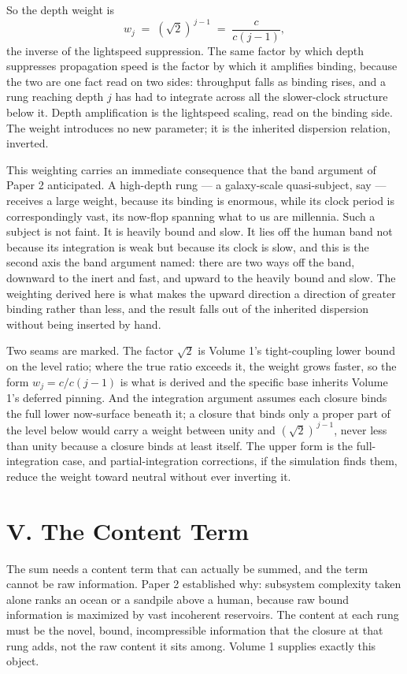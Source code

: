 \documentclass[11pt,oneside]{report}
\theoremstyle{definition}
\theoremstyle{remark}
\begin{document}
So the depth weight is
\[
w_{j} \;=\; (\sqrt{2})^{\,j-1} \;=\; \frac{c}{c(j-1)},
\]
the inverse of the lightspeed suppression. The same factor by which depth
suppresses propagation speed is the factor by which it amplifies binding,
because the two are one fact read on two sides: throughput falls as binding
rises, and a rung reaching depth \ensuremath{j} has had to integrate across all
the slower-clock structure below it. Depth amplification is the lightspeed
scaling, read on the binding side. The weight introduces no new parameter; it
is the inherited dispersion relation, inverted.

This weighting carries an immediate consequence that the band argument of
Paper 2 anticipated. A high-depth rung --- a galaxy-scale quasi-subject, say
--- receives a large weight, because its binding is enormous, while its clock
period is correspondingly vast, its now-flop spanning what to us are
millennia. Such a subject is not faint. It is heavily bound and slow. It lies
off the human band not because its integration is weak but because its clock
is slow, and this is the second axis the band argument named: there are two
ways off the band, downward to the inert and fast, and upward to the heavily
bound and slow. The weighting derived here is what makes the upward direction
a direction of greater binding rather than less, and the result falls out of
the inherited dispersion without being inserted by hand.

Two seams are marked. The factor \ensuremath{\sqrt{2}} is Volume 1's
tight-coupling lower bound on the level ratio; where the true ratio exceeds it,
the weight grows faster, so the form \ensuremath{w_{j} = c/c(j-1)} is what is
derived and the specific base inherits Volume 1's deferred pinning. And the
integration argument assumes each closure binds the full lower now-surface
beneath it; a closure that binds only a proper part of the level below would
carry a weight between unity and \ensuremath{(\sqrt{2})^{\,j-1}}, never less
than unity because a closure binds at least itself. The upper form is the
full-integration case, and partial-integration corrections, if the simulation
finds them, reduce the weight toward neutral without ever inverting it.

\section*{V. The Content Term}

The sum needs a content term that can actually be summed, and the term cannot
be raw information. Paper 2 established why: subsystem complexity taken alone
ranks an ocean or a sandpile above a human, because raw bound information is
maximized by vast incoherent reservoirs. The content at each rung must be the
novel, bound, incompressible information that the closure at that rung adds,
not the raw content it sits among. Volume 1 supplies exactly this object.
\end{document}
